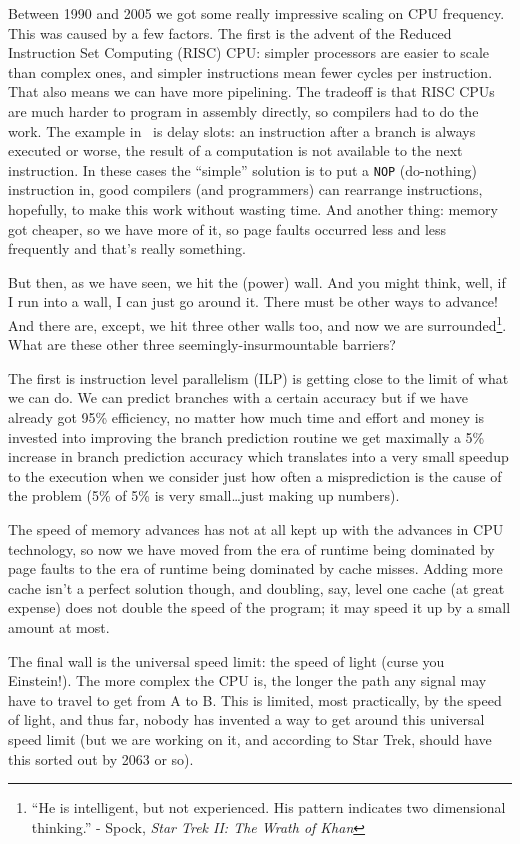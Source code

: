 \documentclass[a4paper]{report}
\begin{document}
Between 1990 and 2005 we got some really impressive scaling on CPU frequency. This was caused by a few factors. The first is the advent of the Reduced Instruction Set Computing (RISC) CPU: simpler processors are easier to scale than complex ones, and simpler instructions mean fewer cycles per instruction. That also means we can have more pipelining. The tradeoff is that RISC CPUs are much harder to program in assembly directly, so compilers had to do the work. The example in~\cite{modern-hardware} is delay slots: an instruction after a branch is always executed or worse, the result of a computation is not available to the next instruction. In these cases the ``simple'' solution is to put a \texttt{NOP} (do-nothing) instruction in, good compilers (and programmers) can rearrange instructions, hopefully, to make this work without wasting time. And another thing: memory got cheaper, so we have more of it, so page faults occurred less and less frequently and that's really something.

But then, as we have seen, we hit the (power) wall. And you might think, well, if I run into a wall, I can just go around it. There must be other ways to advance! And there are, except, we hit three other walls too, and now we are surrounded\footnote{``He is intelligent, but not experienced. His pattern indicates two dimensional thinking.'' - Spock, \textit{Star Trek II: The Wrath of Khan}}. What are these other three seemingly-insurmountable barriers?

The first is instruction level parallelism (ILP) is getting close to the limit of what we can do. We can predict branches with a certain accuracy but if we have already got 95\% efficiency, no matter how much time and effort and money is invested into improving the branch prediction routine we get maximally a 5\% increase in branch prediction accuracy which translates into a very small speedup to the execution when we consider just how often a misprediction is the cause of the problem (5\% of 5\% is very small\ldots just making up numbers).

The speed of memory advances has not at all kept up with the advances in CPU technology, so now we have moved from the era of runtime being dominated by page faults to the era of runtime being dominated by cache misses. Adding more cache isn't a perfect solution though, and doubling, say, level one cache (at great expense) does not double the speed of the program; it may speed it up by a small amount at most. 

The final wall is the universal speed limit: the speed of light (curse you Einstein!). The more complex the CPU is, the longer the path any signal may have to travel to get from A to B. This is limited, most practically, by the speed of light, and thus far, nobody has invented a way to get around this universal speed limit (but we are working on it, and according to Star Trek, should have this sorted out by 2063 or so).
\end{document}
